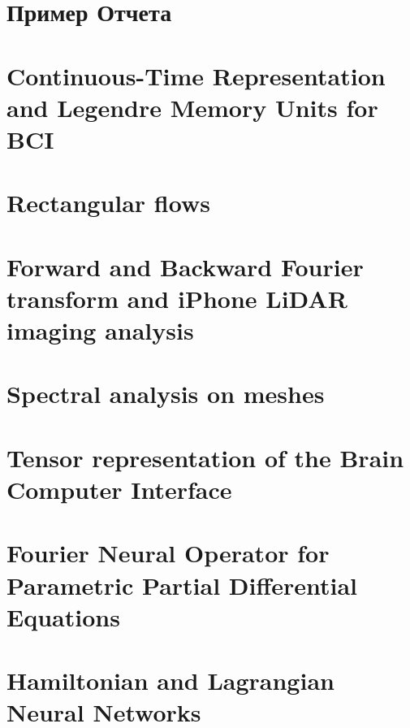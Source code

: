 \documentclass{mybook}
\begin{document}


\setcounter{page}{2}

\newpage
\tableofcontents
    
    \clearpage
    \chapter{Пример Отчета}
    
    
    \clearpage
    \chapter{Continuous-Time Representation and Legendre Memory Units for BCI}
    

    \clearpage
    \chapter{Rectangular flows}
    
    
    \clearpage
    \chapter{Forward and Backward Fourier transform and iPhone LiDAR imaging analysis}
    
    
    \clearpage
    \chapter{Spectral analysis on meshes}
    
    
    \clearpage
    \chapter{Tensor representation of the Brain Computer Interface}
    
    
    \clearpage
    \chapter{Fourier Neural Operator for Parametric Partial Differential Equations}
    
    
    \clearpage
    \chapter{Hamiltonian and Lagrangian Neural Networks}
    
\end{document}
